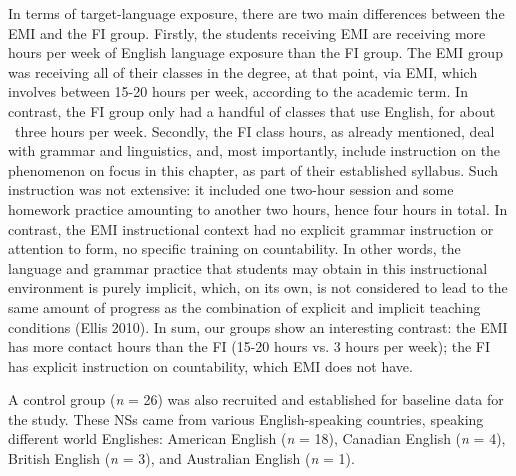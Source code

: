 \documentclass[12pt]{article}
\newenvironment{styleStandard}{\setlength\leftskip{0cm}\setlength\rightskip{0cm plus 1fil}\setlength\parindent{0cm}\setlength\parfillskip{0pt plus 1fil}\setlength\parskip{0in plus 1pt}\writerlistparindent\writerlistleftskip\leavevmode\normalfont\normalsize\writerlistlabel\ignorespaces}{\unskip\vspace{0.111in plus 0.0111in}\par}
\newcommand\writerlistleftskip{}
\newcommand\writerlistparindent{}
\newcommand\writerlistlabel{}
\begin{document}
\begin{styleStandard}
In terms of target-language exposure, there are two main differences between the EMI and the FI group. Firstly, the students receiving EMI are receiving more hours per week of English language exposure than the FI group. The EMI group was receiving all of their classes in the degree, at that point, via EMI, which involves between 15-20 hours per week, according to the academic term. In contrast, the FI group only had a handful of classes that use English, for about \ three hours per week. Secondly, the FI class hours, as already mentioned, deal with grammar and linguistics, and, most importantly, include instruction on the phenomenon on focus in this chapter, as part of their established syllabus. Such instruction was not extensive: it included one two-hour session and some homework practice amounting to another two hours, hence four hours in total. In contrast, the EMI instructional context had no explicit grammar instruction or attention to form, no specific training on countability. In other words, the language and grammar practice that students may obtain in this instructional environment is purely implicit, which, on its own, is not considered to lead to the same amount of progress as the combination of explicit and implicit teaching conditions (Ellis 2010). In sum, our groups show an interesting contrast: the EMI has more contact hours than the FI (15-20 hours vs. 3 hours per week); the FI has explicit instruction on countability, which EMI does not have. 
\end{styleStandard}

\begin{styleStandard}
A control group (\textit{n }= 26) was also recruited and established for baseline data for the study. These NSs came from various English-speaking countries, speaking different world Englishes: American English (\textit{n }= 18), Canadian English (\textit{n }= 4), British English (\textit{n }= 3), and Australian English (\textit{n }= 1). \ 
\end{styleStandard}
\end{document}
